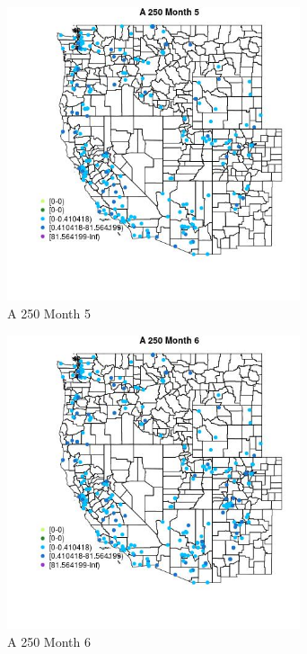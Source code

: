 \begin{figure} 
\centering  
\includegraphics[width=0.77\textwidth]{Code_Outputs/Report_ML_input_PM25_Step4_part_e_de_duplicated_aveswNAs_MapObsMo5A_250.jpg} 
\caption{\label{fig:Report_ML_input_PM25_Step4_part_e_de_duplicated_aveswNAsMapObsMo5A_250}A 250 Month 5} 
\end{figure} 
 

\begin{figure} 
\centering  
\includegraphics[width=0.77\textwidth]{Code_Outputs/Report_ML_input_PM25_Step4_part_e_de_duplicated_aveswNAs_MapObsMo6A_250.jpg} 
\caption{\label{fig:Report_ML_input_PM25_Step4_part_e_de_duplicated_aveswNAsMapObsMo6A_250}A 250 Month 6} 
\end{figure} 
 

